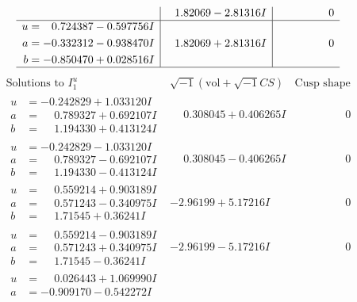 \documentclass[1p]{elsarticle_modified}
\theoremstyle{definition}
\newcommand{\I}{\sqrt{-1}}
\begin{document}
$$\begin{array}{c|c|c}
 & \phantom{-}1.82069 - 2.81316 I & \phantom{-0.000000 } 0 \\ \hline\begin{aligned}
u &= \phantom{-}0.724387 - 0.597756 I \\
a &= -0.332312 - 0.938470 I \\
b &= -0.850470 + 0.028516 I\end{aligned}
 & \phantom{-}1.82069 + 2.81316 I & \phantom{-0.000000 } 0\\
 \hline 
 \end{array}$$\newpage$$\begin{array}{c|c|c}  
\text{Solutions to }I^u_{1}& \I (\text{vol} + \sqrt{-1}CS) & \text{Cusp shape}\\
 \hline 
\begin{aligned}
u &= -0.242829 + 1.033120 I \\
a &= \phantom{-}0.789327 + 0.692107 I \\
b &= \phantom{-}1.194330 + 0.413124 I\end{aligned}
 & \phantom{-}0.308045 + 0.406265 I & \phantom{-0.000000 } 0 \\ \hline\begin{aligned}
u &= -0.242829 - 1.033120 I \\
a &= \phantom{-}0.789327 - 0.692107 I \\
b &= \phantom{-}1.194330 - 0.413124 I\end{aligned}
 & \phantom{-}0.308045 - 0.406265 I & \phantom{-0.000000 } 0 \\ \hline\begin{aligned}
u &= \phantom{-}0.559214 + 0.903189 I \\
a &= \phantom{-}0.571243 - 0.340975 I \\
b &= \phantom{-}1.71545 + 0.36241 I\end{aligned}
 & -2.96199 + 5.17216 I & \phantom{-0.000000 } 0 \\ \hline\begin{aligned}
u &= \phantom{-}0.559214 - 0.903189 I \\
a &= \phantom{-}0.571243 + 0.340975 I \\
b &= \phantom{-}1.71545 - 0.36241 I\end{aligned}
 & -2.96199 - 5.17216 I & \phantom{-0.000000 } 0 \\ \hline\begin{aligned}
u &= \phantom{-}0.026443 + 1.069990 I \\
a &= -0.909170 - 0.542272 I \\

\end{aligned}
\end{array}$$
\end{document}
